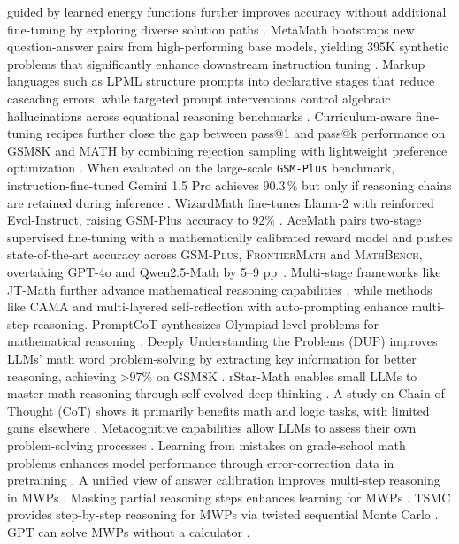 \documentclass[acmsmall,anonymous]{acmart}
\begin{document}
guided by learned energy functions further improves accuracy without additional fine-tuning by exploring diverse solution paths \cite{xu-2023-no-train}.  MetaMath bootstraps new question-answer pairs from high-performing base models, yielding 395K synthetic problems that significantly enhance downstream instruction tuning \cite{yu-2024-metamath}. Markup languages such as LPML structure prompts into declarative stages that reduce cascading errors, while targeted prompt interventions control algebraic hallucinations across equational reasoning benchmarks \cite{yamauchi-2023-lpml,meadows-2025-prompt-interventions}.  Curriculum-aware fine-tuning recipes further close the gap between pass@1 and pass@k performance on GSM8K and MATH by combining rejection sampling with lightweight preference optimization \cite{liu-2023-improving-finetune}.  When evaluated on the large-scale \texttt{GSM-Plus} benchmark, instruction-fine-tuned Gemini 1.5 Pro achieves $90.3\,\%$ but only if reasoning chains are retained during inference \cite{li2024gsmplus}. WizardMath fine-tunes Llama-2 with reinforced Evol-Instruct, raising GSM-Plus accuracy to 92\% \cite{luo2025wizardmath}.  AceMath pairs two-stage supervised fine-tuning with a mathematically
calibrated reward model and pushes state-of-the-art accuracy across
\textsc{GSM-Plus}, \textsc{FrontierMath} and \textsc{MathBench}, overtaking GPT-4o and
Qwen2.5-Math by 5–9 pp~\citep{liu2024acemath}. Multi-stage frameworks like JT-Math further advance mathematical reasoning capabilities \cite{anonymous2025jtmath,anonymous2025jtmath}, while methods like CAMA \cite{anonymous2025cama,anonymous2025cama} and multi-layered self-reflection with auto-prompting \cite{anonymous2025advancingmultistep,anonymous2025advancingmultistep} enhance multi-step reasoning. PromptCoT synthesizes Olympiad-level problems for mathematical reasoning \cite{zhao-etal-2025-promptcot}. Deeply Understanding the Problems (DUP) improves LLMs' math word problem-solving by extracting key information for better reasoning, achieving >97\% on GSM8K \cite{zhong2024achieving}. rStar-Math enables small LLMs to master math reasoning through self-evolved deep thinking \cite{guan2025rstar}. A study on Chain-of-Thought (CoT) shows it primarily benefits math and logic tasks, with limited gains elsewhere \cite{sprague2024a to}. Metacognitive capabilities allow LLMs to assess their own problem-solving processes \cite{didolkar2024metacognitive}. Learning from mistakes on grade-school math problems enhances model performance through error-correction data in pretraining \cite{ye2024physics}. A unified view of answer calibration improves multi-step reasoning in MWPs \cite{deng2023}. Masking partial reasoning steps enhances learning for MWPs \cite{chen2024a}. TSMC provides step-by-step reasoning for MWPs via twisted sequential Monte Carlo \cite{feng2024}. GPT can solve MWPs without a calculator \cite{yang2023b}.
\end{document}

